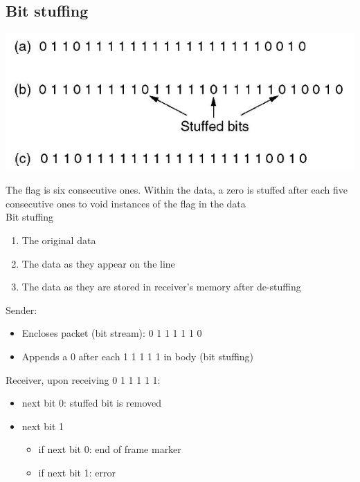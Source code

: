 \documentclass{article}[18pt]
\begin{document}
\subsection{Bit stuffing}
\begin{center}
	\includegraphics[scale=0.7]{"bit stuffing"}
\end{center}
The flag is six consecutive ones. Within the data, a zero is stuffed after each five consecutive ones to void instances of the flag in the data\\
Bit stuffing
\begin{enumerate}[label=(\alph*)]
	\item The original data
	\item The data as they appear on the line
	\item The data as they are stored in receiver's memory after de-stuffing
\end{enumerate}
Sender:
\begin{itemize}
	\item Encloses packet (bit stream): 0 1 1 1 1 1 0
	\item Appends a 0 after each 1 1 1 1 1 in body (bit stuffing)
\end{itemize}
Receiver, upon receiving 0 1 1 1 1 1:
\begin{itemize}
	\item next bit 0: stuffed bit is removed
	\item next bit 1
	\begin{itemize}
		\item if next bit 0: end of frame marker
		\item if next bit 1: error
	\end{itemize}
\end{itemize}
\end{document}
